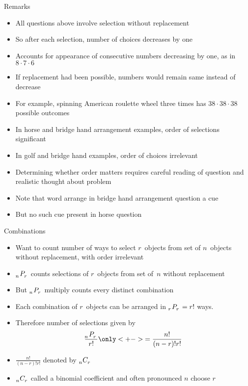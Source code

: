 \documentclass{beamer}
\theoremstyle{definition}
\newcommand\npr[2]{\tensor[_{#1}]P{_{#2}}}
\newcommand\ncr[2]{\tensor[_{#1}]C{_{#2}}}
\begin{document}
\begin{frame}{Remarks}
\begin{itemize}
\item All questions above involve selection \alert{without replacement}
\item So after each selection, number of choices decreases by one
\item Accounts for appearance of consecutive numbers decreasing
by one, as in $8\cdot 7\cdot 6$
\item If replacement had been possible, numbers would remain same
instead of decrease
\item For example, spinning American roulette wheel three times
has $38\cdot 38\cdot 38$ possible outcomes
\end{itemize}
\end{frame}
\begin{frame}
\begin{itemize}
\item In horse and bridge hand arrangement examples, order of selections
significant
\item In golf and bridge hand examples, order of choices irrelevant
\item Determining whether order matters requires careful reading of question
and realistic thought about problem
\item Note that word \alert{arrange} in bridge hand arrangement
question a \alert{cue}
\item But no such cue present in horse question
\end{itemize}
\end{frame}

\begin{frame}{Combinations}
\begin{itemize}
\item Want to count number
of ways to select $r$~objects from set of $n$~objects
without replacement, \alert{with order irrelevant}
\item $\npr{n}{r}$
counts selections of $r$~objects from set of~$n$
without replacement
\item But $\npr{n}{r}$ multiply counts
every distinct \alert{combination}
\item Each combination of $r$~objects can be arranged
in $\npr{r}{r}=r!$ ways.
\item Therefore number of selections
given by \[\frac{\npr{n}{r}}{r!}
\only<+->{=\frac{n!}{\left(n-r\right)!r!}}\]
\item
$\frac{n!}{\left(n-r\right)!r!}$ denoted by $\ncr{n}{r}$
\item $\ncr{n}{r}$ called a \alert{binomial coefficient}
and often pronounced \alert{$n$ choose $r$}
\end{itemize}
\end{frame}
\end{document}
